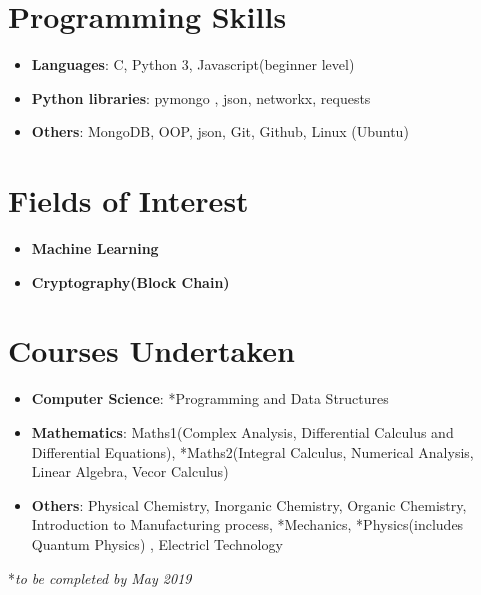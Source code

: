 \documentclass[letterpaper,11pt]{article}
\newcommand{\resumeSubHeadingListStart}{\begin{itemize}[leftmargin=*]}
\newcommand{\resumeSubHeadingListEnd}{\end{itemize}}
\begin{document}
%
\section{Programming Skills}
 \resumeSubHeadingListStart
   \item{
     \textbf{Languages}{: C, Python 3, Javascript(beginner level)}
     \hfill
   }
   \item{
     \textbf{Python libraries}{: pymongo , json, networkx, requests}
     \hfill
   }
   \item{
     \textbf{Others}{: MongoDB, OOP, json, Git, Github, Linux (Ubuntu)}
     \hfill
   }
 \resumeSubHeadingListEnd
\section{Fields of Interest}
  \resumeSubHeadingListStart
  \item{
    \textbf{Machine Learning}
    \hfill
  }
  \item{
    \textbf{Cryptography(Block Chain)}
    \hfill
  }
  \resumeSubHeadingListEnd
\section{Courses Undertaken}
  \resumeSubHeadingListStart
  \item{
    \textbf{Computer Science}{: *Programming and Data Structures}
    \hfill
  }
  \item{  
    \textbf{Mathematics}{: Maths1(Complex Analysis, Differential Calculus and Differential Equations), *Maths2(Integral Calculus, Numerical Analysis, Linear Algebra, Vecor Calculus)}
    \hfill
  }
  \item{
    \textbf{Others}{: Physical Chemistry, Inorganic Chemistry, Organic Chemistry, Introduction to Manufacturing process, *Mechanics, *Physics(includes Quantum Physics) , Electricl Technology}
  }
  \resumeSubHeadingListEnd
  {*}\textit{to be completed by May 2019}
\end{document}

